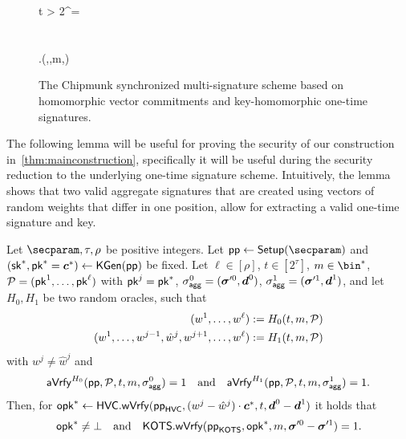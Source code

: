 \begin{figure}[p]
\begin{pchstack}
\begin{pcvstack}
{    \pcif t > 2^\tau \pcor \opk = \bot\\
    \quad {}\\
    \pcelse\\
    \quad \pcreturn \hots.\sverify(\hotsparams,\opk,m,\otsig)
  }
  \pcvspace
\end{pcvstack}
\end{pchstack}
\caption{The Chipmunk synchronized multi-signature scheme based on homomorphic vector commitments and key-homomorphic one-time signatures.}
\label{fig:nidvconst}
\end{figure}

The following lemma will be useful for proving the security of our construction in~\autoref{thm:mainconstruction}, specifically it will be useful during the security reduction to the underlying one-time signature scheme.
Intuitively, the lemma shows that two valid aggregate signatures that are created using vectors of random weights that differ in one position, allow for extracting a valid one-time signature and key.

\begin{lemma}\label{lem:forkingisuseful}
  Let $\secparam,\tau,\rho$ be positive integers.
  Let $\params\gets\setup(\secparam)$ and $(\mathsf{sk}^*,\mathsf{pk}^*=\boldsymbol{c}^*) \gets\mathsf{KGen}(\mathsf{pp})$ be fixed.
  Let $\ell\in[\rho]$, $t\in[2^\tau]$, $m\in\bin^*$, $\mathcal{P} = (\mathsf{pk}^1,\dots,\mathsf{pk}^{\ell})$ with $\mathsf{pk}^j=\mathsf{pk}^*$, $\sigma_\mathsf{agg}^0=(\boldsymbol{\sigma}'^0,\boldsymbol{d}^0)$, $\sigma_\mathsf{agg}^1=(\boldsymbol{\sigma}'^1,\boldsymbol{d}^1)$, and let $H_0,H_1$ be two random oracles, such that 
  \begin{align*}
    (w^1,\dots,w^{\ell}) &:= H_0(t,m,\mathcal{P})\\
    (w^1,\dots,w^{j-1},\hat{w}^j,w^{j+1},\dots,w^{\ell}) &:= H_1(t,m,\mathcal{P})
  \end{align*}
  with $w^j\neq \hat{w}^j$ and
  \[
    \mathsf{aVrfy}^{H_0}(\mathsf{pp},\mathcal{P},t,m,\sigma_\mathsf{agg}^0)=1 \quad \text{and} \quad \mathsf{aVrfy}^{H_1}(\mathsf{pp},\mathcal{P},t,m,\sigma_\mathsf{agg}^1)=1.
  \]
  Then, for $\mathsf{opk}^*\gets\mathsf{HVC}.\mathsf{wVrfy}(\mathsf{pp}_{\mathsf{HVC}},(w^j-\hat{w}^j)\cdot \boldsymbol{c}^*,t,\boldsymbol{d}^0-\boldsymbol{d}^1)$ it holds that
  \[
    \mathsf{opk}^* \neq \bot \quad \text{and} \quad \mathsf{KOTS}.\mathsf{wVrfy}(\mathsf{pp}_{\mathsf{KOTS}},\mathsf{opk}^*,m,\boldsymbol{\sigma}'^0-\boldsymbol{\sigma}'^1) = 1.
  \]
\end{lemma}

